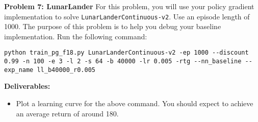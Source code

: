 \documentclass[12pt]{article}
\begin{document}
\textbf{Problem 7: LunarLander} For this problem, you will use your policy gradient implementation to solve \verb|LunarLanderContinuous-v2|.
Use an episode length of 1000. The purpose of this problem is to help you debug your baseline implementation.
Run the following command:
\begin{lstlisting}
python train_pg_f18.py LunarLanderContinuous-v2 -ep 1000 --discount 0.99 -n 100 -e 3 -l 2 -s 64 -b 40000 -lr 0.005 -rtg --nn_baseline --exp_name ll_b40000_r0.005
\end{lstlisting}
\textbf{Deliverables:}
\begin{itemize}
    \item Plot a learning curve for the above command. You should expect to achieve an average return of around 180.
\end{itemize}
\end{document}
